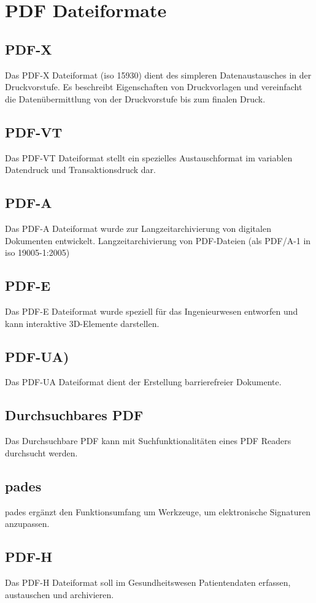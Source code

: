 \section{PDF Dateiformate}

\subsection{PDF-X}
Das PDF-X Dateiformat (\gls{iso} 15930) dient des simpleren Datenaustausches in der Druckvorstufe. Es beschreibt Eigenschaften von Druckvorlagen und vereinfacht die Datenübermittlung von der Druckvorstufe bis zum finalen Druck.

\subsection{PDF-VT}
Das PDF-VT Dateiformat stellt ein spezielles Austauschformat im variablen Datendruck und Transaktionsdruck dar.

\subsection{PDF-A}
Das PDF-A Dateiformat wurde zur Langzeitarchivierung von digitalen Dokumenten entwickelt.
Langzeitarchivierung von PDF-Dateien (als PDF/A-1 in \gls{iso} 19005-1:2005) 

\subsection{PDF-E}
Das PDF-E Dateiformat wurde speziell für das Ingenieurwesen entworfen und kann interaktive 3D-Elemente darstellen.

\subsection{PDF-UA)}
Das PDF-UA Dateiformat dient der Erstellung barrierefreier Dokumente.

\subsection{Durchsuchbares PDF}
Das Durchsuchbare PDF kann mit Suchfunktionalitäten eines PDF Readers durchsucht werden.

\subsection{\gls{pades}}
\gls{pades} ergänzt den Funktionsumfang um Werkzeuge, um elektronische Signaturen anzupassen.

\subsection{PDF-H}
Das PDF-H Dateiformat soll im Gesundheitswesen Patientendaten erfassen, austauschen und archivieren.
